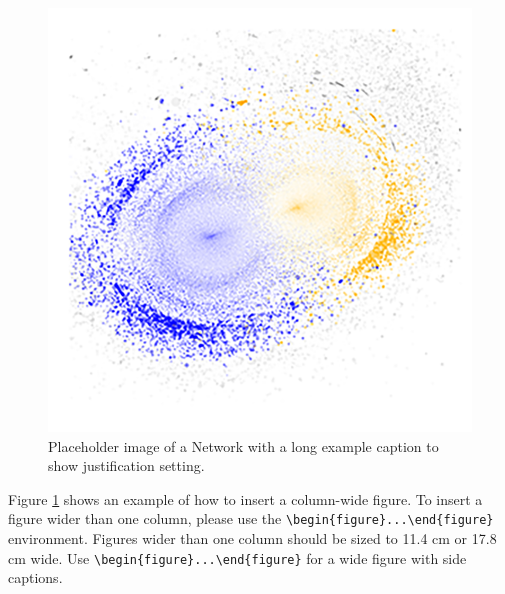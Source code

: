 \documentclass[9pt,twocolumn,twoside]{ilcss}
\begin{document}
\begin{figure}[tbhp]
\centering
\includegraphics[width=.8\linewidth]{net_red}
\caption{Placeholder image of a Network with a long example caption to show justification setting.}
\label{fig:net}
\end{figure}


Figure \ref{fig:net} shows an example of how to insert a column-wide figure. To insert a figure wider than one column, please use the \verb|\begin{figure}...\end{figure}| environment. Figures wider than one column should be sized to 11.4 cm or 17.8 cm wide. Use \verb|\begin{figure}...\end{figure}| for a wide figure with side captions.
\end{document}
